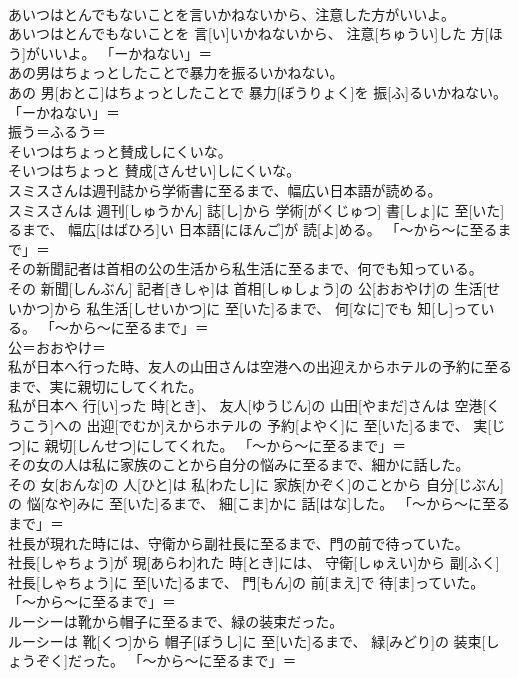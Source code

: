\documentclass[8pt]{extreport}
\begin{document}
\begin{CJK}{UTF8}{min}
\\	あいつはとんでもないことを言いかねないから、注意した方がいいよ。	
\\	あいつはとんでもないことを 言[い]いかねないから、 注意[ちゅうい]した 方[ほう]がいいよ。	「ーかねない」＝ 
\\	あの男はちょっとしたことで暴力を振るいかねない。	
\\	あの 男[おとこ]はちょっとしたことで 暴力[ぼうりょく]を 振[ふ]るいかねない。	「ーかねない」＝ 
\\	振う＝ふるう＝ 
\\	そいつはちょっと賛成しにくいな。	
\\	そいつはちょっと 賛成[さんせい]しにくいな。	
\\	スミスさんは週刊誌から学術書に至るまで、幅広い日本語が読める。	
\\	スミスさんは 週刊[しゅうかん] 誌[し]から 学術[がくじゅつ] 書[しょ]に 至[いた]るまで、 幅広[はばひろ]い 日本語[にほんご]が 読[よ]める。	「〜から〜に至るまで」＝ 
\\	その新聞記者は首相の公の生活から私生活に至るまで、何でも知っている。	
\\	その 新聞[しんぶん] 記者[きしゃ]は 首相[しゅしょう]の 公[おおやけ]の 生活[せいかつ]から 私生活[しせいかつ]に 至[いた]るまで、 何[なに]でも 知[し]っている。	「〜から〜に至るまで」＝ 
\\	公＝おおやけ＝ 
\\	私が日本へ行った時、友人の山田さんは空港への出迎えからホテルの予約に至るまで、実に親切にしてくれた。	
\\	私が日本へ 行[い]った 時[とき]、 友人[ゆうじん]の 山田[やまだ]さんは 空港[くうこう]への 出迎[でむか]えからホテルの 予約[よやく]に 至[いた]るまで、 実[じつ]に 親切[しんせつ]にしてくれた。	「〜から〜に至るまで」＝ 
\\	その女の人は私に家族のことから自分の悩みに至るまで、細かに話した。	
\\	その 女[おんな]の 人[ひと]は 私[わたし]に 家族[かぞく]のことから 自分[じぶん]の 悩[なや]みに 至[いた]るまで、 細[こま]かに 話[はな]した。	「〜から〜に至るまで」＝ 
\\	社長が現れた時には、守衛から副社長に至るまで、門の前で待っていた。	
\\	社長[しゃちょう]が 現[あらわ]れた 時[とき]には、 守衛[しゅえい]から 副[ふく] 社長[しゃちょう]に 至[いた]るまで、 門[もん]の 前[まえ]で 待[ま]っていた。	「〜から〜に至るまで」＝ 
\\	ルーシーは靴から帽子に至るまで、緑の装束だった。	
\\	ルーシーは 靴[くつ]から 帽子[ぼうし]に 至[いた]るまで、 緑[みどり]の 装束[しょうぞく]だった。	「〜から〜に至るまで」＝ 

\end{CJK}
\end{document}
